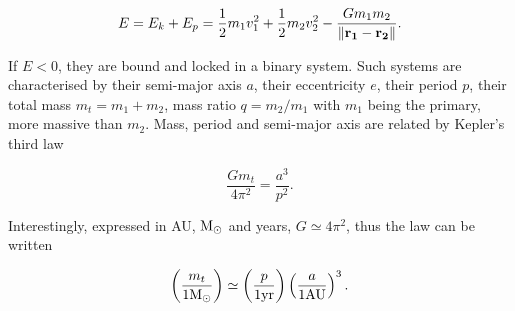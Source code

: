 \begin{equation}
E = E_k + E_p = \frac{1}{2} m_1 v_1^2 + \frac{1}{2} m_2 v_2^2  - \frac{G m_1 m_2}{\| \bold{r_1} - \bold{r_2}\| }.
\end{equation}


If $E<0$, they are bound and locked in a binary system. Such systems are characterised by their semi-major axis $a$, their eccentricity $e$, their period $p$, their total mass $m_t = m_1 + m_2$, mass ratio $q = m_2/m_1$ with $m_1$ being the primary, more massive than $m_2$.
Mass, period and semi-major axis are related by Kepler's third law

\begin{equation}
\frac{G m_t}{4\pi^2} =  \frac{a^3}{p^2}.
\end{equation}

Interestingly, expressed in AU, ${\textrm{M}_\odot}$ and years, $G \simeq 4 \pi^2$, thus the law can be written

\begin{equation}
\left( \frac{m_t}{1 {\textrm{M}_\odot}} \right) \simeq \left( \frac{p}{1 \textrm{yr}} \right) \left( \frac{a}{1 \textrm{AU}} \right)^3 .
\end{equation}




